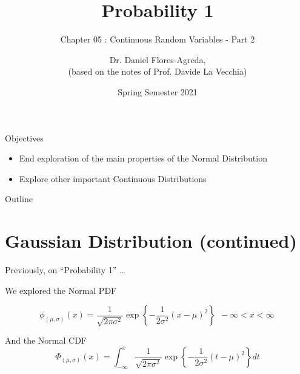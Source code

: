 \documentclass[smaller]{beamer}\usepackage[]{graphicx}\usepackage[]{color}
\begin{document}
\title[S110015]{Probability 1}
\subtitle{Chapter 05 : Continuous Random Variables - Part 2}
\author[Flores-Agreda, La Vecchia]{Dr. Daniel Flores-Agreda, \\[0.5em] \tiny{(based on the notes of Prof. Davide La Vecchia)}}
\date{Spring Semester 2021}

\begin{frame}
\titlepage
\end{frame}


\begin{frame}{Objectives}

\begin{itemize}
\item End exploration of the main properties of the Normal Distribution \bigskip
\item Explore other important Continuous Distributions
\end{itemize}

\end{frame}

\begin{frame}{Outline}
\tableofcontents
\end{frame}


\section{Gaussian Distribution (continued)}

\begin{frame}
  \begin{center}
  \Large Previously, on ``Probability 1'' \dots
  \end{center}
\end{frame}


\begin{frame}{\secname}
We explored the Normal PDF

$$
\phi_{(\mu,\sigma)}(x) =\frac{1}{\sqrt{2\pi \sigma ^{2}}}\exp{ \left\{ -\frac{1%
  }{2\sigma ^{2}}\left( x-\mu \right) ^{2}\right\}}~~-\infty<x<\infty\,
$$

\bigskip

And the Normal CDF
$$
\Phi_{(\mu,\sigma)}(x) =\int_{-\infty}^{x} \frac{1}{\sqrt{2\pi \sigma ^{2}}}\exp{ \left\{ -\frac{1%
  }{2\sigma ^{2}}\left(t-\mu \right) ^{2}\right\}}dt
$$

\end{frame}
\end{document}
